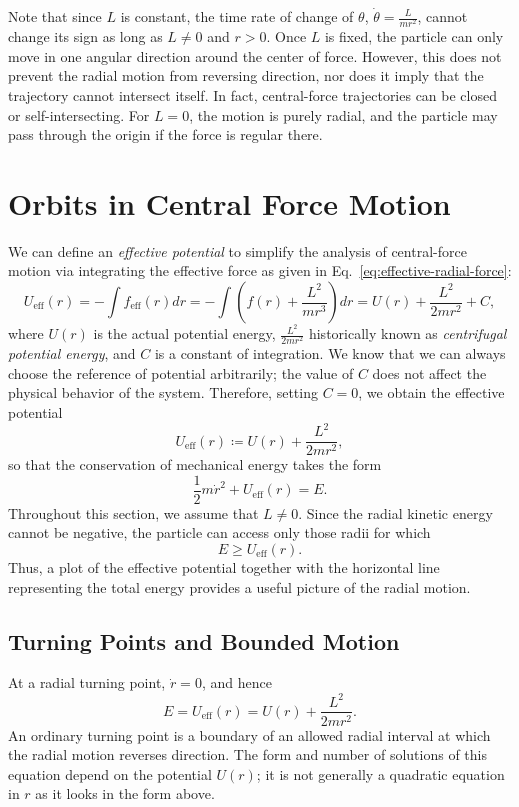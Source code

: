 \documentclass[12pt]{article}
\begin{document}
Note that since $L$ is constant, the time rate of change of $\theta$, $\dot{\theta} = \frac{L}{mr^2}$, cannot change its sign as long as $L\neq 0$ and $r>0$. Once $L$ is fixed, the particle can only move in one angular direction around the center of force. However, this does not prevent the radial motion from reversing direction, nor does it imply that the trajectory cannot intersect itself. In fact, central-force trajectories can be closed or self-intersecting. For $L=0$, the motion is purely radial, and the particle may pass through the origin if the force is regular there.



\section{Orbits in Central Force Motion}

We can define an \emph{effective potential} to simplify the analysis of central-force motion via integrating the effective force  as given in Eq.~\ref{eq:effective-radial-force}:
\begin{equation}
    U_{\mathrm{eff}}(r) = -\int f_{\mathrm{eff}}(r) dr = -\int \left(f(r) + \frac{L^2}{mr^3}\right) dr = U(r) + \frac{L^2}{2mr^2} + C,
    \label{eq:effective-potential}
\end{equation}
where $U(r)$ is the actual potential energy, $\frac{L^2}{2mr^2}$ historically known as \emph{centrifugal potential energy}, and $C$ is a constant of integration. We know that we can always choose the reference of potential arbitrarily; the value of $C$ does not affect the physical behavior of the system. Therefore, setting $C=0$, we obtain the effective potential
\[
    U_{\mathrm{eff}}(r)
    \coloneqq U(r)+\frac{L^2}{2mr^2},
\]
so that the conservation of mechanical energy takes the form
\[
    \frac{1}{2}m\dot r^2+U_{\mathrm{eff}}(r)=E.
\]
Throughout this section, we assume that $L\neq0$. Since the radial kinetic energy cannot be negative, the particle
can access only those radii for which
\[
    E\geq U_{\mathrm{eff}}(r).
\]
Thus, a plot of the effective potential together with the horizontal
line representing the total energy provides a useful picture of
the radial motion.

\subsection{Turning Points and Bounded Motion}

At a radial turning point, $\dot r=0$, and hence
\[
    E=U_{\mathrm{eff}}(r)
    =U(r)+\frac{L^2}{2mr^2}.
\]
An ordinary turning point is a boundary of an allowed radial
interval at which the radial motion reverses direction.
The form and number of solutions of this equation depend on
the potential $U(r)$; it is not generally a quadratic equation in $r$ as it looks in the form above.
\end{document}

